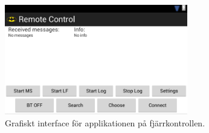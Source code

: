 \begin{figure}[htbp!]
\centering
\includegraphics[width=8cm]{../../includes/figures/remoteApp.png}
\caption{Grafiskt interface för applikationen på fjärrkontrollen.}
\label{fig:remoteApp}
\end{figure}
